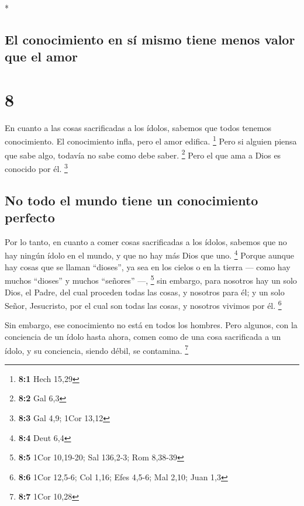 \begin{paracol}{2}
\begin{otherlanguage}{english}
\end{otherlanguage}

\switchcolumn[0]*

\hypertarget{el-conocimiento-en-suxed-mismo-tiene-menos-valor-que-el-amor}{%
\subsection{El conocimiento en sí mismo tiene menos valor que el
amor}\label{el-conocimiento-en-suxed-mismo-tiene-menos-valor-que-el-amor}}

\hypertarget{section-14}{%
\section{8}\label{section-14}}

 En cuanto a las cosas sacrificadas a los ídolos, sabemos
que todos tenemos conocimiento. El conocimiento infla, pero el amor
edifica. \footnote{\textbf{8:1} Hech 15,29}  Pero si
alguien piensa que sabe algo, todavía no sabe como debe saber.
\footnote{\textbf{8:2} Gal 6,3}  Pero el que ama a Dios es
conocido por él. \footnote{\textbf{8:3} Gal 4,9; 1Cor 13,12}

\hypertarget{no-todo-el-mundo-tiene-un-conocimiento-perfecto}{%
\subsection{No todo el mundo tiene un conocimiento
perfecto}\label{no-todo-el-mundo-tiene-un-conocimiento-perfecto}}

 Por lo tanto, en cuanto a comer cosas sacrificadas a los
ídolos, sabemos que no hay ningún ídolo en el mundo, y que no hay más
Dios que uno. \footnote{\textbf{8:4} Deut 6,4}  Porque
aunque hay cosas que se llaman ``dioses'', ya sea en los cielos o en la
tierra --- como hay muchos ``dioses'' y muchos ``señores'' ---,
\footnote{\textbf{8:5} 1Cor 10,19-20; Sal 136,2-3; Rom 8,38-39}
 sin embargo, para nosotros hay un solo Dios, el Padre,
del cual proceden todas las cosas, y nosotros para él; y un solo Señor,
Jesucristo, por el cual son todas las cosas, y nosotros vivimos por él.
\footnote{\textbf{8:6} 1Cor 12,5-6; Col 1,16; Efes 4,5-6; Mal 2,10; Juan
  1,3}

 Sin embargo, ese conocimiento no está en todos los
hombres. Pero algunos, con la conciencia de un ídolo hasta ahora, comen
como de una cosa sacrificada a un ídolo, y su conciencia, siendo débil,
se contamina. \footnote{\textbf{8:7} 1Cor 10,28}


\end{paracol}
